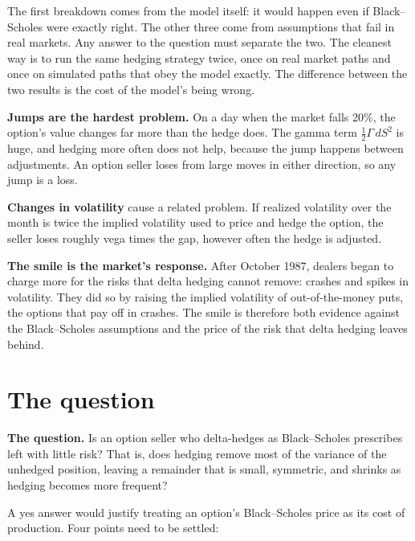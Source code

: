 The first breakdown comes from the model itself: it would happen even if Black--Scholes were exactly right. The other three come from assumptions that fail in real markets. Any answer to the question must separate the two. The cleanest way is to run the same hedging strategy twice, once on real market paths and once on simulated paths that obey the model exactly. The difference between the two results is the cost of the model's being wrong.

\textbf{Jumps are the hardest problem.} On a day when the market falls 20\%, the option's value changes far more than the hedge does. The gamma term $\tfrac{1}{2}\Gamma\,dS^2$ is huge, and hedging more often does not help, because the jump happens between adjustments. An option seller loses from large moves in either direction, so any jump is a loss.

\textbf{Changes in volatility} cause a related problem. If realized volatility over the month is twice the implied volatility used to price and hedge the option, the seller loses roughly vega times the gap, however often the hedge is adjusted.

\textbf{The smile is the market's response.} After October 1987, dealers began to charge more for the risks that delta hedging cannot remove: crashes and spikes in volatility. They did so by raising the implied volatility of out-of-the-money puts, the options that pay off in crashes. The smile is therefore both evidence against the Black--Scholes assumptions and the price of the risk that delta hedging leaves behind.


\section{The question}
\label{sec:14-claim}

\begin{callout}
\textbf{The question.} Is an option seller who delta-hedges as Black--Scholes prescribes left with little risk? That is, does hedging remove most of the variance of the unhedged position, leaving a remainder that is small, symmetric, and shrinks as hedging becomes more frequent?
\end{callout}

A yes answer would justify treating an option's Black--Scholes price as its cost of production. Four points need to be settled:

